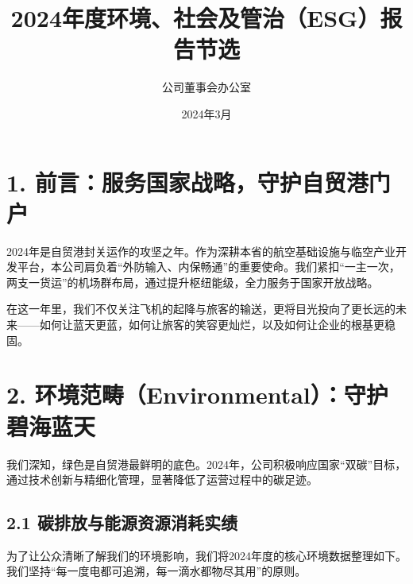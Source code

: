 \documentclass[a4paper,12pt]{article}
\title{\textbf{2024年度环境、社会及管治（ESG）报告节选}}
\author{公司董事会办公室}
\date{2024年3月}
\begin{document}
\maketitle


\section{1. 前言：服务国家战略，守护自贸港门户}

2024年是自贸港封关运作的攻坚之年。作为深耕本省的航空基础设施与临空产业开发平台，本公司肩负着“外防输入、内保畅通”的重要使命。我们紧扣“一主一次，两支一货运”的机场群布局，通过提升枢纽能级，全力服务于国家开放战略。

在这一年里，我们不仅关注飞机的起降与旅客的输送，更将目光投向了更长远的未来——如何让蓝天更蓝，如何让旅客的笑容更灿烂，以及如何让企业的根基更稳固。

\section{2. 环境范畴（Environmental）：守护碧海蓝天}

我们深知，绿色是自贸港最鲜明的底色。2024年，公司积极响应国家“双碳”目标，通过技术创新与精细化管理，显著降低了运营过程中的碳足迹。

\subsection{2.1 碳排放与能源资源消耗实绩}

为了让公众清晰了解我们的环境影响，我们将2024年度的核心环境数据整理如下。我们坚持“每一度电都可追溯，每一滴水都物尽其用”的原则。
\end{document}
